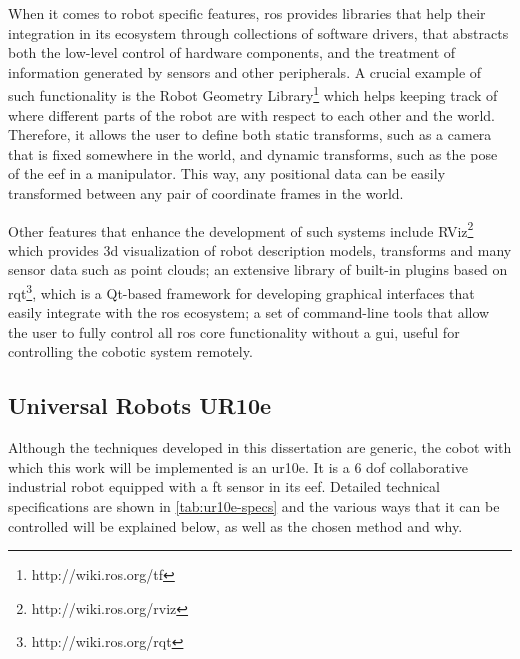 \par When it comes to robot specific features, \ac{ros} provides libraries that help their integration  in its ecosystem through collections of software drivers, that abstracts both the low-level control of hardware components, and the treatment of information generated by sensors and other peripherals. A crucial example of such functionality is the Robot Geometry Library\footnote{http://wiki.ros.org/tf} which helps keeping track of where different parts of the robot are with respect to each other and the world. Therefore, it allows the user to define both static transforms, such as a camera that is fixed somewhere in the world, and dynamic transforms, such as the pose of the \ac{eef} in a manipulator. This way, any positional data can be easily transformed between any pair of coordinate frames in the world.
\par Other features that enhance the development of such systems include RViz\footnote{http://wiki.ros.org/rviz} which provides \acs{3d} visualization of robot description models, transforms and many sensor data such as point clouds; an extensive library of built-in plugins based on rqt\footnote{http://wiki.ros.org/rqt}, which is a Qt-based framework for developing graphical interfaces that easily integrate with the \ac{ros} ecosystem; a set of command-line tools that allow the user to fully control all \ac{ros} core functionality without a \ac{gui}, useful for controlling the cobotic system remotely.

\subsection{Universal Robots UR10e}

\par Although the techniques developed in this dissertation are generic, the cobot with which this work will be implemented is an \ac{ur10e}. It is a 6 \ac{dof} collaborative industrial robot equipped with a \ac{ft} sensor in its \ac{eef}. Detailed technical specifications are shown in \autoref{tab:ur10e-specs} and the various ways that it can be controlled will be explained below, as well as the chosen method and why.

